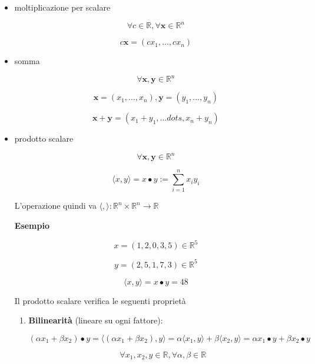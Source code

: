 \documentclass[11pt]{article}
\begin{document}
\begin{itemize}
    \item moltiplicazione per scalare

        \[
            \forall c \in \mathbb{R}, \forall \textbf{x} \in \mathbb{R}^{n}
        \]

        \[
            c \textbf{x} = (cx_1, \ldots ,cx_n)
        \]

    \item somma

        \[
            \forall \textbf{x}, \textbf{y}  \in \mathbb{R}^{n}
        \]

        \[
       \textbf{x}  =(x_1, \ldots ,x_n), \textbf{y}  = (y_1, \ldots ,y_n)
        \]

        \[
            \textbf{x}+ \textbf{y} = (x_1+y_1, \ldots dots ,x_n+y_n)
        \]

    \item prodotto scalare

        \[
            \forall \textbf{x} ,\textbf{y} \in \mathbb{R}^{n}
        \]

        \[
            \langle x,y \rangle  = x \bullet y := \sum^{n}_{i=1} x_i y_i
        \]

        L'operazione quindi va $\langle , \rangle : \mathbb{R}^{n} \times \mathbb{R}^{n} \rightarrow \mathbb{R}$

        \textbf{Esempio} 

        \[
            x=(1,2,0,3,5) \in \mathbb{R}^{5}
        \]

        \[
            y=(2,5,1,7,3) \in \mathbb{R}^{5}
        \]

        \[
            \langle x,y \rangle  = x \bullet y = 48
        \]

        Il prodotto scalare verifica le seguenti proprietà

        \begin{enumerate}
            \item \textbf{Bilinearità} (lineare su ogni fattore):

                \[
                    (\alpha x_1 + \beta x_2) \bullet y = \langle (\alpha x_1 + \beta x_2), y \rangle  = \alpha \langle x_1,y \rangle+ \beta \langle x_2,y \rangle = \alpha x_1 \bullet y + \beta x_2 \bullet y
                \]

                \[
                    \forall x_1,x_2,y \in \mathbb{R}, \forall \alpha, \beta \in \mathbb{R}
                \]


\end{enumerate}
\end{itemize}
\end{document}
